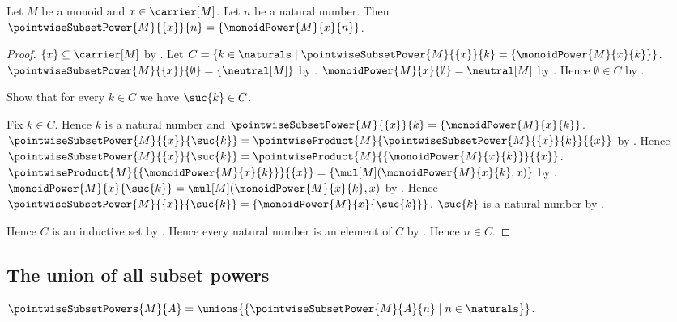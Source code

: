 \begin{theorem}\label{pointwise_subset_power_singleton}
    Let $M$ be a monoid and $x\in\carrier[M]$.
    Let $n$ be a natural number.
    Then $\pointwiseSubsetPower{M}{\{x\}}{n}
        =\{\monoidPower{M}{x}{n}\}$.
\end{theorem}
\begin{proof}
    $\{x\}\subseteq\carrier[M]$ by
        .
    Let $C=\{k\in\naturals\mid
        \pointwiseSubsetPower{M}{\{x\}}{k}
            =\{\monoidPower{M}{x}{k}\}\}$.
    $\pointwiseSubsetPower{M}{\{x\}}{\emptyset}
        =\{\neutral[M]\}$ by
        .
    $\monoidPower{M}{x}{\emptyset}=\neutral[M]$ by
        .
    Hence $\emptyset\in C$ by .

    Show that for every $k\in C$ we have $\suc{k}\in C$.
    \begin{subproof}
        Fix $k\in C$.
        Hence $k$ is a natural number and
            $\pointwiseSubsetPower{M}{\{x\}}{k}
                =\{\monoidPower{M}{x}{k}\}$.
        $\pointwiseSubsetPower{M}{\{x\}}{\suc{k}}
            =\pointwiseProduct{M}{
                \pointwiseSubsetPower{M}{\{x\}}{k}}{\{x\}}$ by
            .
        Hence $\pointwiseSubsetPower{M}{\{x\}}{\suc{k}}
            =\pointwiseProduct{M}{\{\monoidPower{M}{x}{k}\}}{\{x\}}$.
        $\pointwiseProduct{M}{\{\monoidPower{M}{x}{k}\}}{\{x\}}
            =\{\mul[M](\monoidPower{M}{x}{k},x)\}$ by
            .
        $\monoidPower{M}{x}{\suc{k}}
            =\mul[M](\monoidPower{M}{x}{k},x)$ by
            .
        Hence $\pointwiseSubsetPower{M}{\{x\}}{\suc{k}}
            =\{\monoidPower{M}{x}{\suc{k}}\}$.
        $\suc{k}$ is a natural number by .
    \end{subproof}
    Hence $C$ is an inductive set by .
    Hence every natural number is an element of $C$ by
        .
    Hence $n\in C$.
\end{proof}

\subsection{The union of all subset powers}

\begin{definition}\label{pointwise_subset_powers}
    $\pointwiseSubsetPowers{M}{A}
        =\unions{\{\pointwiseSubsetPower{M}{A}{n}\mid
            n\in\naturals\}}$.
\end{definition}

